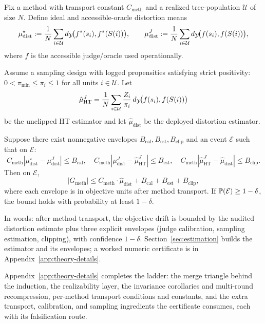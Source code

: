 \begin{theorem}\label{thm:e2e}
Fix a method with transport constant $C_{\mathrm{meth}}$ and a realized tree-population $\mathcal{U}$ of size $N$. Define ideal and accessible-oracle distortion means
\[
\mu_{\mathrm{dist}}^{\star}:=\frac{1}{N}\sum_{i\in\mathcal{U}} d_{\mathcal{Y}}\!\big(f^\ast(s_i),f^\ast(S(i))\big),\qquad
\mu_{\mathrm{dist}}^{J}:=\frac{1}{N}\sum_{i\in\mathcal{U}} d_{\mathcal{Y}}\!\big(f(s_i),f(S(i))\big),
\]
where $f$ is the accessible judge/oracle used operationally.

Assume a sampling design with logged propensities satisfying strict positivity: $0 < \pi_{\min} \le \pi_i \le 1$ for all units $i \in \mathcal{U}$. Let
\[
\hat{\mu}_{\mathrm{HT}}^{J}=\frac{1}{N}\sum_{i\in\mathcal{U}}\frac{Z_i}{\pi_i}\,d_{\mathcal{Y}}\!\big(f(s_i),f(S(i))\big)
\]
be the unclipped HT estimator and let $\hat{\mu}_{\mathrm{dist}}$ be the deployed distortion estimator.

Suppose there exist nonnegative envelopes $B_{\mathrm{cal}}, B_{\mathrm{est}}, B_{\mathrm{clip}}$ and an event $\mathcal{E}$ such that on $\mathcal{E}$:
\[
C_{\mathrm{meth}}\!\left|\mu_{\mathrm{dist}}^{\star}-\mu_{\mathrm{dist}}^{J}\right|\le B_{\mathrm{cal}},\quad
C_{\mathrm{meth}}\!\left|\mu_{\mathrm{dist}}^{J}-\hat{\mu}_{\mathrm{HT}}^{J}\right|\le B_{\mathrm{est}},\quad
C_{\mathrm{meth}}\!\left|\hat{\mu}_{\mathrm{HT}}^{J}-\hat{\mu}_{\mathrm{dist}}\right|\le B_{\mathrm{clip}}.
\]
Then on $\mathcal{E}$,
\[
|G_{\mathrm{meth}}| \le C_{\mathrm{meth}} \cdot \hat{\mu}_{\mathrm{dist}} + B_{\mathrm{cal}} + B_{\mathrm{est}} + B_{\mathrm{clip}},
\]
where each envelope is in objective units after method transport. If $\mathbb{P}(\mathcal{E})\ge 1-\delta$, the bound holds with probability at least $1-\delta$.
\end{theorem}

\noindent In words: after method transport, the objective drift is bounded by the audited distortion estimate plus three explicit envelopes (judge calibration, sampling estimation, clipping), with confidence $1-\delta$. Section~\ref{sec:estimation} builds the estimator and its envelopes; a worked numeric certificate is in Appendix~\ref{app:theory-details}.

Appendix~\ref{app:theory-details} completes the ladder: the merge
triangle behind the induction, the realizability layer, the invariance
corollaries and multi-round recompression, per-method transport
conditions and constants, and the extra transport, calibration, and
sampling ingredients the certificate consumes, each with its
falsification route.

